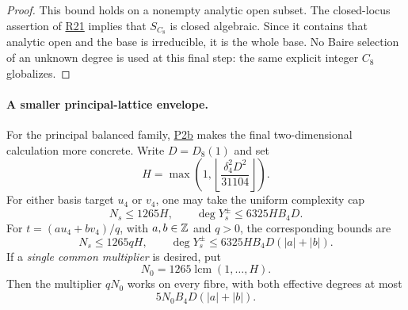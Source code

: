 \documentclass[11pt,a4paper]{article}
\theoremstyle{definition}\newtheorem{definition}[theorem]{Definition}
\theoremstyle{remark}\newtheorem{remark}[theorem]{Remark}
\newcommand{\findingref}[1]{\hyperref[#1]{\textsf{#1}}}
\begin{document}
\begin{proof}
This bound holds on a nonempty analytic open subset. The closed-locus assertion of \findingref{R21} implies that $S_{C_8}$ is closed algebraic. Since it contains that analytic open and the base is irreducible, it is the whole base. No Baire selection of an unknown degree is used at this final step: the same explicit integer $C_8$ globalizes.
\end{proof}

\paragraph{A smaller principal-lattice envelope.}
For the principal balanced family, \findingref{P2b} makes the final two-dimensional calculation more concrete. Write $D=D_8(1)$ and set
\begin{equation}\label{eq:SQ-H}
 H=\max\left(1,\left\lfloor
              \frac{\delta_4^2D^2}{31104}\right\rfloor\right).
\end{equation}
For either basis target $u_4$ or $v_4$, one may take the uniform complexity cap
\begin{equation}\label{eq:SQ-principalcap}
 N_s\le1265H,\qquad
 \deg Y_s^\pm\le6325H B_4D.
\end{equation}
For $t=(a u_4+b v_4)/q$, with $a,b\in\mathbb Z$ and $q>0$, the corresponding bounds are
\begin{equation}\label{eq:SQ-generaltargetcap}
 N_s\le1265qH,\qquad
 \deg Y_s^\pm\le6325H B_4D(|a|+|b|).
\end{equation}
If a \emph{single common multiplier} is desired, put
\begin{equation}\label{eq:SQ-commonN}
 N_0=1265\operatorname{lcm}(1,\ldots,H).
\end{equation}
Then the multiplier $qN_0$ works on every fibre, with both effective degrees at most
\begin{equation}\label{eq:SQ-commonD}
 5N_0B_4D(|a|+|b|).
\end{equation}
\end{document}
